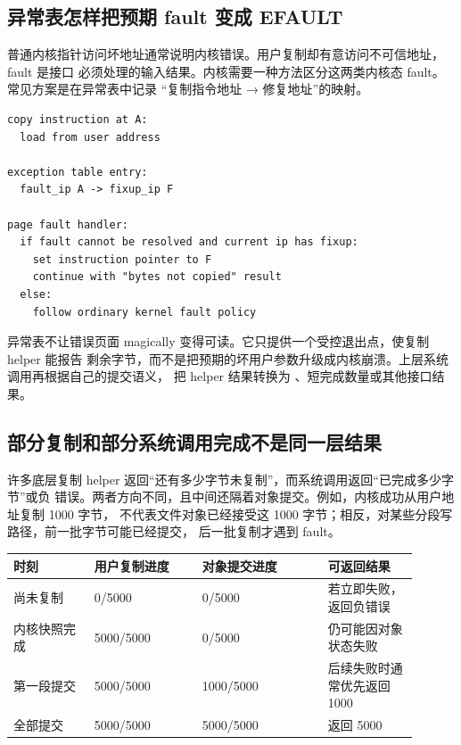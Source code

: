 \subsection{异常表怎样把预期 fault 变成 EFAULT}

普通内核指针访问坏地址通常说明内核错误。用户复制却有意访问不可信地址，fault 是接口
必须处理的输入结果。内核需要一种方法区分这两类内核态 fault。常见方案是在异常表中记录
“复制指令地址 → 修复地址”的映射。

\begin{lstlisting}
copy instruction at A:
  load from user address

exception table entry:
  fault_ip A -> fixup_ip F

page fault handler:
  if fault cannot be resolved and current ip has fixup:
    set instruction pointer to F
    continue with "bytes not copied" result
  else:
    follow ordinary kernel fault policy
\end{lstlisting}

异常表不让错误页面 magically 变得可读。它只提供一个受控退出点，使复制 helper 能报告
剩余字节，而不是把预期的坏用户参数升级成内核崩溃。上层系统调用再根据自己的提交语义，
把 helper 结果转换为 、短完成数量或其他接口结果。

\subsection{部分复制和部分系统调用完成不是同一层结果}

许多底层复制 helper 返回“还有多少字节未复制”，而系统调用返回“已完成多少字节”或负
错误。两者方向不同，且中间还隔着对象提交。例如，内核成功从用户地址复制 1000 字节，
不代表文件对象已经接受这 1000 字节；相反，对某些分段写路径，前一批字节可能已经提交，
后一批复制才遇到 fault。

\begin{longtable}{|L{0.18\linewidth}|L{0.24\linewidth}|L{0.28\linewidth}|L{0.20\linewidth}|}
\hline
时刻 & 用户复制进度 & 对象提交进度 & 可返回结果 \\ \hline
尚未复制 & 0/5000 & 0/5000 & 若立即失败，返回负错误 \\ \hline
内核快照完成 & 5000/5000 & 0/5000 & 仍可能因对象状态失败 \\ \hline
第一段提交 & 5000/5000 & 1000/5000 & 后续失败时通常优先返回 1000 \\ \hline
全部提交 & 5000/5000 & 5000/5000 & 返回 5000 \\ \hline
\end{longtable}

